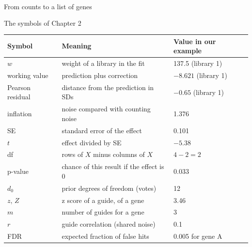 \documentclass[aspectratio=169,11pt]{beamer}
\begin{document}
\begin{frame}{From counts to a list of genes}
\begin{center}
\end{center}
\end{frame}

\begin{frame}{The symbols of Chapter 2}
\centering\footnotesize\renewcommand{\arraystretch}{0.95}
\begin{tabular}{@{}lll@{}}
\toprule
Symbol & Meaning & Value in our example\\
\midrule
$w$ & weight of a library in the fit & 137.5 (library 1)\\
working value & prediction plus correction & $-8.621$ (library 1)\\
Pearson residual & distance from the prediction in SDs & $-0.65$ (library 1)\\
inflation & noise compared with counting noise & 1.376\\
SE & standard error of the effect & 0.101\\
$t$ & effect divided by SE & $-5.38$\\
df & rows of $X$ minus columns of $X$ & $4 - 2 = 2$\\
p-value & chance of this result if the effect is 0 & 0.033\\
$d_0$ & prior degrees of freedom (votes) & 12\\
$z$, $Z$ & z score of a guide, of a gene & 3.46\\
$m$ & number of guides for a gene & 3\\
$r$ & guide correlation (shared noise) & 0.1\\
FDR & expected fraction of false hits & 0.005 for gene A\\
\bottomrule
\end{tabular}
\end{frame}
\end{document}
